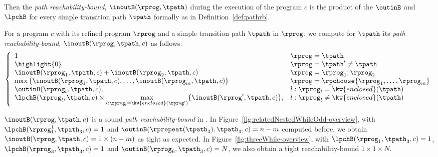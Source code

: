 Then the \emph{path reachability-bound}, $\inoutB(\rprog, \tpath)$ during the execution of the program $c$ is the product of the $\outinB$ and $\lpchB$ for every simple transition path $\tpath$ formally as in Definition~\ref{def:pathrb}.
%
\begin{defn}
 \label{def:pathrb}
 For a program $c$ with its refined program $\rprog$ and a simple transition path $\tpath$ in $\rprog$, 
 we compute for $\tpath$ its \emph{path reachability-bound}, $\inoutB(\rprog, \tpath, c)$
 as follows. 
{\small 
\[
 \left\{ 
 \begin{array}{ll}
 1 & \rprog = \tpath\\
 \highlight{0} & \rprog = \tpath' \neq \tpath\\
 \inoutB(\rprog_1, \tpath, c) + \inoutB(\rprog_2, \tpath, c) & \rprog = \rprog_1;\rprog_2 \\
 \max\left\{ \inoutB(\rprog_1, \tpath, c), \ldots, \inoutB(\rprog_m, \tpath, c) \right\} 
 & \rprog = \rpchoose{\rprog_1, \ldots, \rprog_m } \\
 \outinB(\rprog_l, \tpath, c), & l: \rprog_l = \kw{enclosed}(\tpath) \\
 \lpchB(\rprog_l, \tpath , c)
 \times \max\limits_{l:\rprog_l = \kw{enclosed}(\rprog')}
 \{\inoutB(\rprog', \tpath, c)\} , & l: \rprog_l \neq \kw{enclosed}(\tpath) \\
 \end{array}
 \right.
 \]
 }
 \end{defn}

$\inoutB(\rprog, \tpath, c)$ is a sound \emph{path reachability-bound}
in .
%
In Figure~\ref{fig:relatedNestedWhileOdd-overview}, with $\lpchB(\rprog_1^1, \tpath_3, c) = 1$ and
$\outinB(\rprepeat(\tpath_3), \tpath_3, c) = n - m$ computed before,
we obtain $\inoutB(\rprog, \tpath, c) = 1 \times (n - m)$ as tight as expected.
In Figure~\ref{fig:threeWhile-overview}, with $\lpchB(\rprog_1, \tpath_3, c) = 1$,
$\lpchB(\rprog_3, \tpath_3, c) = 1$ and
$\outinB(\rprog_6, \tpath_3, c) = N$,
we also obtain a tight reachability-bound $1 \times 1 \times N$.

